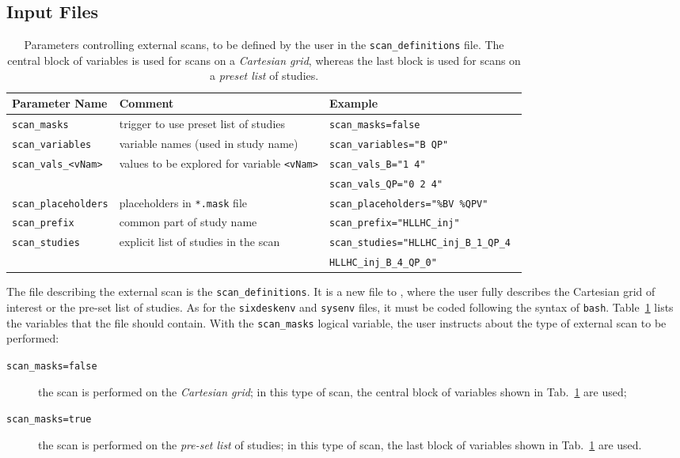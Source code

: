 \subsection{Input Files}
\begin{table}[t]
\begin{center}
  \caption{Parameters controlling external scans, to be defined by
    the user in the \texttt{scan\_definitions} file. The central
    block of variables is used for scans on a \emph{Cartesian grid},
    whereas the last block is used for scans on a \emph{preset list}
    of studies.}
    \label{tab:ExternalScanParameters}
    \begin{tabular}{|l|l|l|}
    \hline
    \rowcolor{blue!30}
    \textbf{Parameter Name} & \textbf{Comment} & \textbf{Example} \\
    \hline
    \texttt{scan\_masks} & trigger to use preset list of studies &
       \texttt{scan\_masks=false} \\
    \hline
    \texttt{scan\_variables} & variable names (used in study name) &
       \texttt{scan\_variables="B QP"} \\
    \texttt{scan\_vals\_<vNam>} & values to be explored for variable \texttt{<vNam>} &
    \texttt{scan\_vals\_B="1 4"} \\
    & & \texttt{scan\_vals\_QP="0 2 4"} \\
    \texttt{scan\_placeholders} & placeholders in \texttt{*.mask} file &
       \texttt{scan\_placeholders="\%BV  \%QPV"} \\
    \texttt{scan\_prefix} & common part of study name &
       \texttt{scan\_prefix="HLLHC\_inj"} \\
    \hline
    \texttt{scan\_studies} & explicit list of studies in the scan &
    \texttt{scan\_studies="HLLHC\_inj\_B\_1\_QP\_4  } \\
    & & \texttt{HLLHC\_inj\_B\_4\_QP\_0"} \\
    \hline
    \end{tabular}
\end{center}
\end{table}
The file describing the external scan is the \texttt{scan\_definitions}.
It is a new file to \SIXDESK{}, where the user fully describes the Cartesian
grid of interest or the pre-set list of studies. As for the
\texttt{sixdeskenv} and \texttt{sysenv} files, it must be coded
following the syntax of \texttt{bash}.
Table~\ref{tab:ExternalScanParameters}
lists the variables that the file should contain.
With the \texttt{scan\_masks} logical variable, the user instructs
\SIXDESK{} about the type of external scan to be performed:
\begin{description}
\item[\texttt{scan\_masks=false}] the scan is performed on the
  \emph{Cartesian grid}; in this type of scan, the central
  block of variables shown in Tab.~\ref{tab:ExternalScanParameters}
  are used;
\item[\texttt{scan\_masks=true}] the scan is performed on the
  \emph{pre-set list} of studies; in this type of scan, the last
  block of variables shown in Tab.~\ref{tab:ExternalScanParameters}
  are used.
\end{description}

